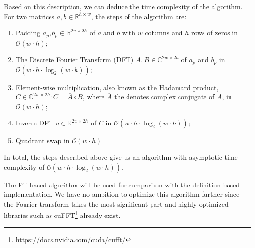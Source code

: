 Based on this description, we can deduce the time complexity of the algorithm. For two matrices $a,b \in \mathbb{R}^{h \times w}$, the steps of the algorithm are:
\begin{enumerate}
	\item Padding $a_p, b_p \in \mathbb{R}^{2w \times 2h}$ of $a$ and $b$ with $w$ columns and $h$ rows of zeros in $\mathcal{O}(w \cdot h)$;
	\item The Discrete Fourier Transform (DFT) $A,B \in \mathbb{C}^{2w \times 2h}$ of $a_p$ and $b_p$ in $\mathcal{O}(w \cdot h \cdot \log_2(w \cdot h))$;
	\item Element-wise multiplication, also known as the Hadamard product, $C \in \mathbb{C}^{2w \times 2h}: C = \overline{A} \circ B$, where $\overline{A}$ the denotes complex conjugate of $A$, in $\mathcal{O}(w \cdot h)$;
	\item Inverse DFT $c \in \mathbb{R}^{2w \times 2h}$ of $C$ in $\mathcal{O}(w \cdot h \cdot \log_2(w \cdot h))$;
	\item Quadrant swap in $\mathcal{O}(w \cdot h)$
\end{enumerate}

In total, the steps described above give us an algorithm with asymptotic time complexity of $\mathcal{O}(w \cdot h \cdot \log_2(w \cdot h))$.

The FT-based algorithm will be used for comparison with the definition-based implementation. We have no ambition to optimize this algorithm further since the Fourier transform takes the most significant part and highly optimized libraries such as cuFFT\footnote{\url{https://docs.nvidia.com/cuda/cufft/}} already exist.
